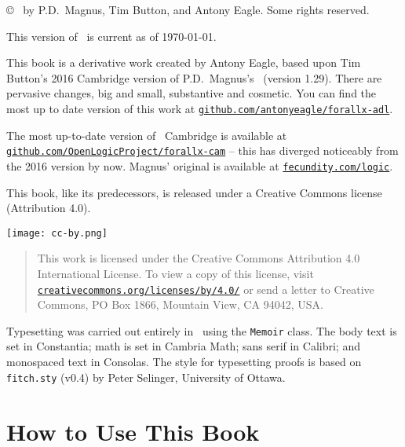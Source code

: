 {\copyright\  by P.D.\ Magnus, Tim Button, and Antony Eagle. Some rights reserved.

This version of \forallxadl\ is current as of \today.

\medskip

This book is a derivative work created by Antony Eagle, based upon Tim Button's 2016 Cambridge version of P.D.\ Magnus's \forallx\ (version 1.29). There are pervasive changes, big and small, substantive and cosmetic. You can find the most up to date version of this work at \href{https://github.com/antonyeagle/forallx-adl}{\nolinkurl{github.com/antonyeagle/forallx-adl}}. 

The most up-to-date version of \forallx\ Cambridge is available at \href{https://github.com/OpenLogicProject/forallx-cam}{\nolinkurl{github.com/OpenLogicProject/forallx-cam}} – this has diverged noticeably from the 2016 version by now. Magnus' original is available at \href{http://fecundity.com/logic}{\nolinkurl{fecundity.com/logic}}. 

This book, like its predecessors, is released under a Creative Commons license (Attribution 4.0).\medskip 

\begin{center}
	\texttt{[image: cc-by.png]} 
\end{center}

\begin{quote}
	{\small This work is licensed under the Creative Commons Attribution 4.0 International License. To view a copy of this license, visit \href{https://creativecommons.org/licenses/by/4.0/}{\nolinkurl{creativecommons.org/licenses/by/4.0/}} or send a letter to Creative Commons, PO Box 1866, Mountain View, CA 94042, USA.} 
\end{quote} \medskip


\vfill

Typesetting was carried out entirely in \XeLaTeX\ using the \texttt{Memoir} class. The body text is set in Constantia; math is set in Cambria Math; sans serif in Calibri; and monospaced text in Consolas. The style for typesetting proofs is based on \texttt{fitch.sty} (v0.4) by Peter Selinger, University of Ottawa.

\newpage
\tableofcontents*

\chapter*{How to Use This Book}

}

